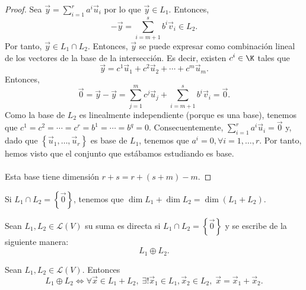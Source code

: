 \begin{proof}
Sea $\displaystyle \vec{y} = \sum^{r}_{i = 1} a^{i}\vec{u}_{i}$ por lo que $\displaystyle \vec{y} \in L_{1} $. Entonces, 
\[-\vec{y} = \sum^{s}_{i = m+1}b^{i}\vec{v}_{i} \in L_{2} .\]
Por tanto, $\displaystyle \vec{y} \in L_{1}\cap L_{2} $. Entonces, $\displaystyle \vec{y} $ se puede expresar como combinación lineal de los vectores de la base de la intersección. Es decir, existen $\displaystyle c^{i} \in \K $ tales que 
\[\vec{y} = c^{1}\vec{u}_{1} + c^{2}\vec{u}_{2} + \cdots + c^{m}\vec{u}_{m} .\]
Entonces, 
\[\vec{0} = \vec{y} - \vec{y} = \sum^{m}_{j=1}c^{j}\vec{u}_{j} + \sum^{s}_{i = m+1}b^{i}\vec{v}_{i} = \vec{0} .\]
Como la base de $\displaystyle L_{2} $ es linealmente independiente (porque es una base), tenemos que $\displaystyle c^{1} = c^{2} = \cdots = c^{r} = b^{1} = \cdots = b^{q} = 0 $. Consecuentemente, $\displaystyle \sum^{r}_{i=1}a^{i}\vec{u}_{i} = \vec{0} $ y, dado que $\displaystyle \left\{ \vec{u}_{1}, \ldots, \vec{u}_{r}\right\}  $ es base de $\displaystyle L_{1} $, tenemos que $\displaystyle a^{i}=0, \forall i = 1, \ldots, r $. Por tanto, hemos visto que el conjunto que estábamos estudiando es base. \\ \\
Esta base tiene dimensión $\displaystyle r + s = r + \left(s + m\right) - m$.
\end{proof}

Si $\displaystyle L_{1}\cap L_{2} = \left\{ \vec{0}\right\}  $, tenemos que $\displaystyle \dim L_{1} + \dim L_{2} = \dim \left(L_{1} + L_{2}\right) $.

\begin{fdefinition}[]
	\normalfont Sean $\displaystyle L_{1}, L_{2} \in \mathcal{L}\left(V\right) $ su suma es directa si $\displaystyle L_{1} \cap L_{2} = \left\{ \vec{0}\right\}  $ y se escribe de la siguiente manera:
	\[L_{1} \oplus L_{2}.\]
\end{fdefinition}

\begin{fprop}[]
	\normalfont Sean $\displaystyle L_{1}, L_{2} \in \mathcal{L}\left(V\right) $. Entonces
	\[L_{1} \oplus L_{2} \iff \forall \vec{x}\in L_{1} + L_{2}, \; \exists!\vec{x}_{1} \in L_{1}, \vec{x}_{2} \in L_{2}, \; \vec{x} = \vec{x}_{1} + \vec{x}_{2} .\]
\end{fprop}

